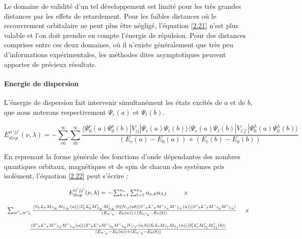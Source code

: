 	Le domaine de validité d'un tel développement est limité pour les très grandes distances par les effets de retardement. Pour les faibles distances où le recouvrement orbitalaire ne peut plus être négligé, l'équation \ref{2.21} n'est plus valable et l'on doit prendre en compte l'énergie de répulsion. Pour des distances comprises entre ces deux domaines, où il n'existe généralement que très peu d'informations expérimentales, les méthodes dites asymptotiques peuvent apporter de précieux résultats.
	
	
	\paragraph{Energie de dispersion}
	
	L'énergie de dispersion fait intervenir simultanément les états excités de $a$ et de $b$, que nous noterons respectivement $\Psi_{r}(a)$ et $\Psi_{t}(b)$.
	
	\begin{equation}
	E_{disp}^{ii'jj'} (\nu , \lambda) = - \sum_{r0}^{\infty} \sum_{t0}^{\infty} \frac{\langle \Psi_{0}^{\nu} (a) \Psi_{0}^{\nu} (b)| V_{ij}|\Psi_{r} (a) \Psi_{t} (b) \rangle  \langle \Psi_{r} (a) \Psi_{t} (b) |V_{i'j'}| \Psi_{0}^{\lambda} (a) \Psi_{0}^{\lambda}(b) \rangle}{(E_{r} (a) - E_{0} (a)) + (E_{t} (b) - E_{0} (b))} \label{2.22}
	\end{equation}
	
	En reprenant la forme générale des fonctions d'onde dépendantes des nombres quantiques orbitaux, magnétiques et de spin de chacun des systèmes pris isolément, l'équation \ref{2.22} peut s'écrire : 
	
	\begin{equation}
	\begin{array}{c}
	E_{disp}^{ii'jj'} (\nu , \lambda) = - \sum_{k=1}^{n_{\nu}} \sum_{l=1}^{n_{\lambda}} \alpha_{\nu , k} \alpha_{\lambda , l} \hspace{1cm} x \\
	\\
	\sum_{w"_{a} w"_{b}} \frac{\langle S_{k} L_{k} M_{S_{K}} M_{L_{K}} (a) |\langle S'_{k} L'_{k} M'_{S_{K}} M'_{L_{K}} (b)| V_{ij} (ab) | S"_{a} L"_{a} M"_{S_{a}} M"_{L_{a}} (a)\rangle| S"_{b} L"_{b} M"_{S_{b}} M"_{L_{b}} \rangle}{(E_{n"_{a}} - E_{0}(a)) + (E_{n"_{b}} - E_{0}(b))} \hspace{0.5 cm} x \\
	\\
	\frac{\langle S"_{a} L"_{a} M"_{S_{a}} M"_{L_{a}} (a)| \langle S"_{b} L"_{b} M"_{S_{b}} M"_{L_{b}} | V_{i'j'}(a,b)| S_{l} L_{l} M_{S_{l}} M_{L_{l}} (a) \rangle | S'_{l} L'_{l} M'_{S_{l}} M'_{L_{l}} (b) \rangle}{(E_{n"_{a}} - E_{0} (a)) + (E_{n"_{b}} - E_{0}(b))}
	\end{array}
	\end{equation}
	
